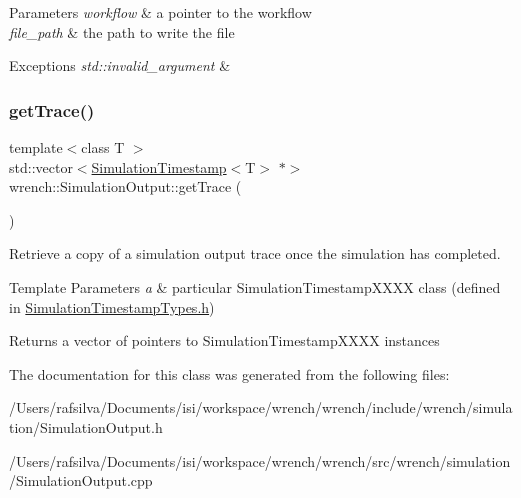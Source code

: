 \begin{DoxyParams}{Parameters}
{\em workflow} & a pointer to the workflow \\
\hline
{\em file\+\_\+path} & the path to write the file\\
\hline
\end{DoxyParams}

\begin{DoxyExceptions}{Exceptions}
{\em std\+::invalid\+\_\+argument} & \\
\hline
\end{DoxyExceptions}
\mbox{\label{classwrench_1_1_simulation_output_a1d03324f34db985d0e181e42cf30cd9d}} 
\subsubsection{\texorpdfstring{get\+Trace()}{getTrace()}}
{\footnotesize\ttfamily template$<$class T $>$ \\
std\+::vector$<$\hyperlink{classwrench_1_1_simulation_timestamp}{Simulation\+Timestamp}$<$T$>$ $\ast$$>$ wrench\+::\+Simulation\+Output\+::get\+Trace (\begin{DoxyParamCaption}{ }\end{DoxyParamCaption})\hspace{0.3cm}{\ttfamily [inline]}}



Retrieve a copy of a simulation output trace once the simulation has completed. 


\begin{DoxyTemplParams}{Template Parameters}
{\em a} & particular Simulation\+Timestamp\+X\+X\+XX class (defined in \hyperlink{_simulation_timestamp_types_8h_source}{Simulation\+Timestamp\+Types.\+h}) \\
\hline
\end{DoxyTemplParams}
\begin{DoxyReturn}{Returns}
a vector of pointers to Simulation\+Timestamp\+X\+X\+XX instances 
\end{DoxyReturn}


The documentation for this class was generated from the following files\+:\begin{DoxyCompactItemize}
\item 
/\+Users/rafsilva/\+Documents/isi/workspace/wrench/wrench/include/wrench/simulation/Simulation\+Output.\+h\item 
/\+Users/rafsilva/\+Documents/isi/workspace/wrench/wrench/src/wrench/simulation/Simulation\+Output.\+cpp\end{DoxyCompactItemize}
